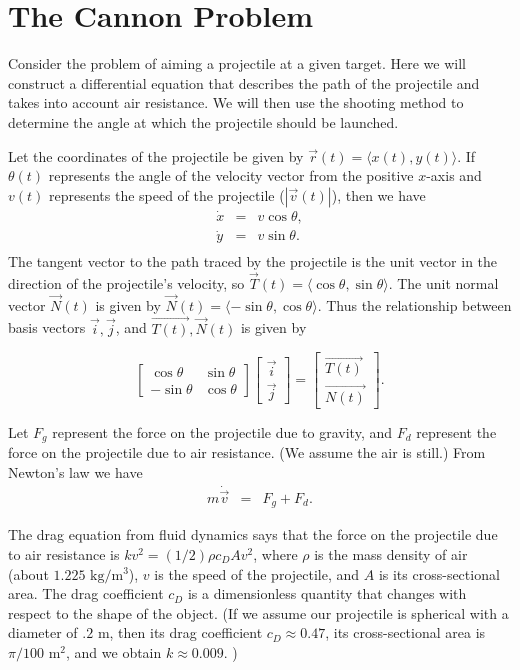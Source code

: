 \section*{The Cannon Problem}

Consider the problem of aiming a projectile at a given target. Here we will construct a differential equation that describes the path of the projectile and takes into account air resistance. We will then use the shooting method to determine the angle at which the projectile should be launched. 

Let the coordinates of the projectile be given by $\vec{r}(t) = \langle x(t), y(t) \rangle.$ If $\theta(t)$ represents the angle of the velocity vector from the positive $x$-axis and $v(t)$ represents the speed of the projectile ($ |\vec{v}(t) |$), then we have 
\begin{eqnarray*}
\dot{x} &=& v\cos{\theta},\\
\dot{y} &=& v\sin{\theta}.\\
\end{eqnarray*}
The tangent vector to the path traced by the projectile is the unit vector in the direction of the projectile's velocity, so $\vec{T}(t) = \langle \cos{\theta}, \sin{\theta} \rangle.$ The unit normal vector $\vec{N} (t)$ is given by $\vec{N} (t)= \langle -\sin{\theta}, \cos{\theta} \rangle.$ Thus the relationship between basis vectors $\vec{i}, \vec{j}$, and $\vec{T(t)}, \vec{N}(t)$ is given by 

\[
\left[\begin{array}{cc}\cos{\theta} & \sin{\theta} \\-\sin{\theta} & \cos{\theta}\end{array}\right] \left[\begin{array}{c}\vec{i} \\\vec{j}\end{array}\right] = \left[\begin{array}{c}\vec{T(t)} \\\vec{N(t)}\end{array}\right]
.\]


Let $F_g$ represent the force on the projectile due to gravity, and $F_d$ represent the force on the projectile due to air resistance. (We assume the air is still.) From Newton's law we have
\begin{eqnarray*}
m \dot{\vec{v}} &=& F_g + F_d.
\end{eqnarray*}

The drag equation from fluid dynamics says that the force on the projectile due to air resistance is $k v^2 = (1/2)\rho c_D A v^2$, where $\rho$ is the mass density of air (about $1.225$ $\text{kg}/\text{m}^3$), $v$ is the speed of the projectile, and $A$ is its cross-sectional area.  The drag coefficient $c_D$ is a dimensionless quantity that changes with respect to the shape of the object. (If we assume our projectile is spherical with a diameter of $.2$ m, then its drag coefficient $c_D \approx 0.47$, its cross-sectional area is $\pi/100$ $ \text{m}^2$, and we obtain $k \approx 0.009.$ )


